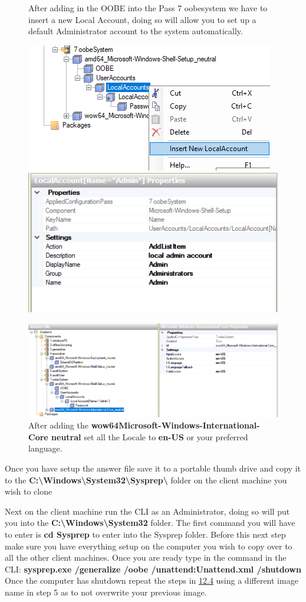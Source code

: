 \documentclass{article}
\begin{document}
\begin{figure}[h]
	After adding in the OOBE into the Pass 7 oobesystem we have to insert a new Local Account, doing so will allow you to set up a default Administrator account to the system automatically.
	
	\includegraphics[width=0.5\linewidth]{"sysprep/3-23-2018 13-36-14"}
	\includegraphics[width=0.5\linewidth]{"sysprep/3-23-2018 13-36-26"}
\end{figure}
\begin{figure}[h]
	\centering
	\includegraphics[width=1\linewidth]{"sysprep/3-23-2018 13-35-25"}
	After adding the \textbf{wow64\textunderscore Microsoft-Windows-International-Core neutral} set all the Locale to \textbf{en-US} or your preferred language.
\end{figure}
\newpage
Once you have setup the answer file save it to a portable thumb drive and copy it to the \textbf{C:\textbackslash Windows\textbackslash System32\textbackslash Sysprep\textbackslash} folder on the client machine you wish to clone
\newline

Next on the client machine run the CLI as an Administrator, doing so will put you into the \textbf{C:\textbackslash Windows\textbackslash System32} folder. The first command you will have to enter is \textbf{cd Sysprep} to enter into the Sysprep folder. Before this next step make sure you have everything setup on the computer you wish to copy over to all the other client machines. Once you are ready type in the command in the CLI:
\newline
\textbf{sysprep.exe /generalize /oobe /unattend:Unattend.xml /shutdown}
\newline
Once the computer has shutdown repeat the steps in \hyperref[sec:12.4]{12.4} using a different image name in step 5 as to not overwrite your previous image.
\newpage
\end{document}
